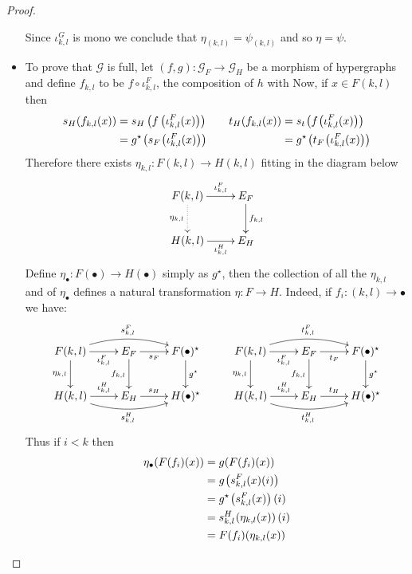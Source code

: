 \documentclass[3p]{elsarticle}
\theoremstyle{remark}
\theoremstyle{definition}
\begin{document}
\begin{proof}
\begin{itemize}
		Since $\iota^G_{k,l}$ is mono we conclude that $\eta_{(k,l)}=\psi_{(k,l)}$ and so $\eta = \psi$.
		\item To prove that $\mathcal{G}$ is full, let $(f,g)\colon \mathcal{G}_F\to \mathcal{G}_{H}$ be a morphism of hypergraphs and define $f_{k,l}$ to be $f\circ \iota^F_{k,l}$, the composition of $h$ with Now, if $x\in F(k,l)$ then 
		\[\begin{split}
			s_H (f_{k,l} (x))&=s_H \left(f \left(\iota^F_{k,l} (x)\right)\right)\\&=g^{\star}\hspace{-1pt}\left(s_{F} \hspace{-1pt}\left(\iota^F_{k,l} (x)\right)\right)
		\end{split}\qquad \begin{split}
			t_H (f_{k,l} (x))&=s_t\hspace{-1pt} \left(f \hspace{-1pt}\left(\iota^F_{k,l} (x)\right)\right)\\&=g^{\star}\hspace{-1pt} \left(t_{F}\hspace{-1pt} \left(\iota^F_{k,l} (x)\right)\right)
		\end{split}\]
		Therefore there exists $\eta_{k,l}\colon F(k,l)\to H(k,l)$ fitting in the diagram below
		\[\xymatrix{F(k,l) \ar[r]^-{\iota^{F}_{k,l}} \ar@{.>}[d]_{\eta_{k,l}}& E_F \ar[d]^{f_{k,l}}\\ H(k,l) \ar[r]_-{\iota^{H}_{k,l}}& E_H}\]
		Define $\eta_{\bullet}\colon F(\bullet)\to H(\bullet)$ simply as $g^\star$, then  the collection of all the $\eta_{k,l}$ and of $\eta_\bullet$ defines a natural transformation $\eta\colon F\to H$. Indeed, if $f_i\colon (k,l)\to \bullet$ we have:
		\[\xymatrix{F(k,l) \ar@/^.4cm/[rr]^{s^F_{k,l}} \ar[r]_-{\iota^{F}_{k,l}} \ar[d]_{\eta_{k,l}}& E_F \ar[d]_{f_{k,l}} \ar[r]_-{s_F}& F(\bullet)^\star \ar[d]^{g^\star}&F(k,l) \ar@/^.4cm/[rr]^{t^F_{k,l}}\ar[r]_-{\iota^{F}_{k,l}} \ar[d]_{\eta_{k,l}}& E_F \ar[d]_{f_{k,l}} \ar[r]_-{t_F}& F(\bullet)^\star \ar[d]^{g^\star}\\ H(k,l) \ar@/_.4cm/[rr]_{s^H_{k,l}} \ar[r]^-{\iota^{H}_{k,l}}& E_H \ar[r]^-{s_H}& H(\bullet)^\star& H(k,l) \ar@/_.4cm/[rr]_{t^H_{k,l}} \ar[r]^-{\iota^{H}_{k,l}}& E_H \ar[r]^-{t_H}& H(\bullet)^\star}\]
		Thus if $i<k$ then
		\begin{align*}
			\eta_\bullet(F(f_i)(x))&=g(F(f_i)(x))\\&=g\hspace{-1pt}\left(s^F_{k,l}(x)(i)\right)\\&=g^\star\hspace{-1pt}\left(s^F_{k,l}(x)\right)(i)\\&=s^H_{k,l}\hspace{-1pt}\left(\eta_{k,l}(x)\right)(i)\\&=F(f_i)(\eta_{k,l}(x))

\end{align*}
\end{itemize}
\end{proof}
\end{document}

